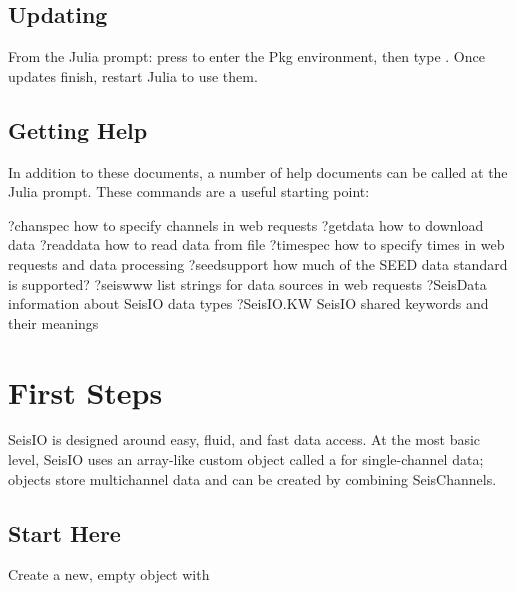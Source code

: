 \documentclass[letterpaper,11pt,english]{sphinxmanual}
\begin{document}
\subsection{Updating}
\label{\detokenize{src/intro:updating}}
From the Julia prompt: press \sphinxcode{\sphinxupquote{{]}}} to enter the Pkg environment, then type
. Once updates finish, restart Julia to use them.


\subsection{Getting Help}
\label{\detokenize{src/intro:getting-help}}
In addition to these documents, a number of help documents can be called at the
Julia prompt. These commands are a useful starting point:

\begin{sphinxVerbatim}[commandchars=\\\{\}]
?chanspec           \PYGZsh{} how to specify channels in web requests
?get\PYGZus{}data           \PYGZsh{} how to download data
?read\PYGZus{}data          \PYGZsh{} how to read data from file
?timespec           \PYGZsh{} how to specify times in web requests and data processing
?seed\PYGZus{}support       \PYGZsh{} how much of the SEED data standard is supported?
?seis\PYGZus{}www           \PYGZsh{} list strings for data sources in web requests
?SeisData           \PYGZsh{} information about SeisIO data types
?SeisIO.KW          \PYGZsh{} SeisIO shared keywords and their meanings
\end{sphinxVerbatim}


\section{First Steps}
\label{\detokenize{src/tutorial:first-steps}}\label{\detokenize{src/tutorial:tutorial}}\label{\detokenize{src/tutorial::doc}}
SeisIO is designed around easy, fluid, and fast data access.
At the most basic level, SeisIO uses an array-like custom object called a
 for single-channel data;  objects store
multichannel data and can be created by combining SeisChannels.


\subsection{Start Here}
\label{\detokenize{src/tutorial:start-here}}
Create a new, empty  object with
\end{document}
